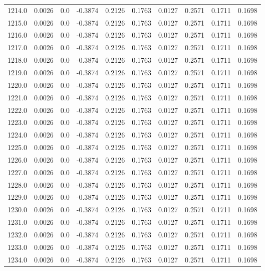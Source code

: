 \begin{longtable}{lrrrrrrrrr}
1214.0 & 0.0026 & 0.0 & -0.3874 & 0.2126 & 0.1763 & 0.0127 & 0.2571 & 0.1711 & 0.1698 \\
1215.0 & 0.0026 & 0.0 & -0.3874 & 0.2126 & 0.1763 & 0.0127 & 0.2571 & 0.1711 & 0.1698 \\
1216.0 & 0.0026 & 0.0 & -0.3874 & 0.2126 & 0.1763 & 0.0127 & 0.2571 & 0.1711 & 0.1698 \\
1217.0 & 0.0026 & 0.0 & -0.3874 & 0.2126 & 0.1763 & 0.0127 & 0.2571 & 0.1711 & 0.1698 \\
1218.0 & 0.0026 & 0.0 & -0.3874 & 0.2126 & 0.1763 & 0.0127 & 0.2571 & 0.1711 & 0.1698 \\
1219.0 & 0.0026 & 0.0 & -0.3874 & 0.2126 & 0.1763 & 0.0127 & 0.2571 & 0.1711 & 0.1698 \\
1220.0 & 0.0026 & 0.0 & -0.3874 & 0.2126 & 0.1763 & 0.0127 & 0.2571 & 0.1711 & 0.1698 \\
1221.0 & 0.0026 & 0.0 & -0.3874 & 0.2126 & 0.1763 & 0.0127 & 0.2571 & 0.1711 & 0.1698 \\
1222.0 & 0.0026 & 0.0 & -0.3874 & 0.2126 & 0.1763 & 0.0127 & 0.2571 & 0.1711 & 0.1698 \\
1223.0 & 0.0026 & 0.0 & -0.3874 & 0.2126 & 0.1763 & 0.0127 & 0.2571 & 0.1711 & 0.1698 \\
1224.0 & 0.0026 & 0.0 & -0.3874 & 0.2126 & 0.1763 & 0.0127 & 0.2571 & 0.1711 & 0.1698 \\
1225.0 & 0.0026 & 0.0 & -0.3874 & 0.2126 & 0.1763 & 0.0127 & 0.2571 & 0.1711 & 0.1698 \\
1226.0 & 0.0026 & 0.0 & -0.3874 & 0.2126 & 0.1763 & 0.0127 & 0.2571 & 0.1711 & 0.1698 \\
1227.0 & 0.0026 & 0.0 & -0.3874 & 0.2126 & 0.1763 & 0.0127 & 0.2571 & 0.1711 & 0.1698 \\
1228.0 & 0.0026 & 0.0 & -0.3874 & 0.2126 & 0.1763 & 0.0127 & 0.2571 & 0.1711 & 0.1698 \\
1229.0 & 0.0026 & 0.0 & -0.3874 & 0.2126 & 0.1763 & 0.0127 & 0.2571 & 0.1711 & 0.1698 \\
1230.0 & 0.0026 & 0.0 & -0.3874 & 0.2126 & 0.1763 & 0.0127 & 0.2571 & 0.1711 & 0.1698 \\
1231.0 & 0.0026 & 0.0 & -0.3874 & 0.2126 & 0.1763 & 0.0127 & 0.2571 & 0.1711 & 0.1698 \\
1232.0 & 0.0026 & 0.0 & -0.3874 & 0.2126 & 0.1763 & 0.0127 & 0.2571 & 0.1711 & 0.1698 \\
1233.0 & 0.0026 & 0.0 & -0.3874 & 0.2126 & 0.1763 & 0.0127 & 0.2571 & 0.1711 & 0.1698 \\
1234.0 & 0.0026 & 0.0 & -0.3874 & 0.2126 & 0.1763 & 0.0127 & 0.2571 & 0.1711 & 0.1698 \\

\end{longtable}
